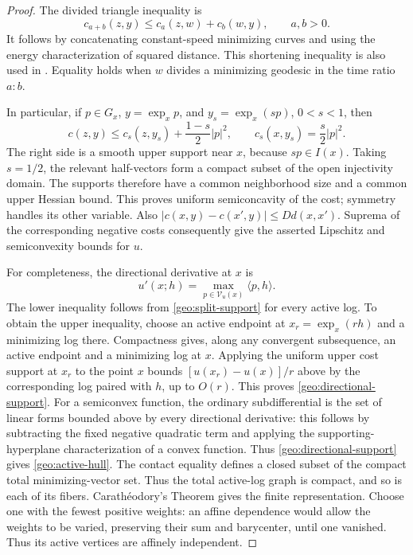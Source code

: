 \begin{proof}
The divided triangle inequality is
\begin{equation}
 \label{geo:divided-triangle}
 c_{a+b}(z,y)\leq c_a(z,w)+c_b(w,y),\qquad a,b>0.
\end{equation}
It follows by concatenating constant-speed minimizing curves and using
the energy characterization of squared distance. This shortening
inequality is also used in \cite[Claim~2.4]{CMS2001}.
Equality holds when
$w$ divides a minimizing geodesic in the time ratio $a:b$.

In particular, if $p\in G_x$, $y=\exp_xp$, and $y_s=\exp_x(sp)$,
$0<s<1$, then
\begin{equation}
 \label{geo:split-support}
 c(z,y)\leq c_s(z,y_s)+\frac{1-s}{2}|p|^2,
 \qquad c_s(x,y_s)=\frac{s}{2}|p|^2.
\end{equation}
The right side is a smooth upper support near $x$, because $sp\in I(x)$.
Taking $s=1/2$, the relevant half-vectors form a compact subset of the
open injectivity domain.  The supports therefore have a common
neighborhood size and a common upper Hessian bound.  This proves
uniform semiconcavity of the cost; symmetry handles its other variable.
Also
$|c(x,y)-c(x',y)|\leq Dd(x,x')$.  Suprema of the corresponding
negative costs consequently give the asserted Lipschitz and
semiconvexity bounds for $u$.

For completeness, the directional derivative at $x$ is
\begin{equation}
 \label{geo:directional-support}
 u'(x;h)=\max_{p\in\mathcal V_u(x)}\langle p,h\rangle.
\end{equation}
The lower inequality follows from \eqref{geo:split-support} for every
active log.  To obtain the upper inequality, choose an active endpoint
at $x_r=\exp_x(rh)$ and a minimizing log there.  Compactness gives,
along any convergent subsequence, an active endpoint and a minimizing
log at $x$.  Applying the uniform upper cost support at $x_r$ to the
point $x$ bounds
$[u(x_r)-u(x)]/r$ above by the corresponding log paired with $h$,
up to $O(r)$.  This proves \eqref{geo:directional-support}.
For a semiconvex function, the ordinary subdifferential is the set of
linear forms bounded above by every directional derivative: this
follows by subtracting the fixed negative quadratic term and applying
the supporting-hyperplane characterization of a convex function.
Thus \eqref{geo:directional-support} gives \eqref{geo:active-hull}.
The contact equality defines a closed subset of the compact total
minimizing-vector set. Thus the total active-log graph is compact,
and so is each of its fibers.  Carath\'eodory's Theorem gives the finite
representation.  Choose one with the fewest positive weights: an
affine dependence would allow the weights to be varied, preserving
their sum and barycenter, until one vanished.  Thus its active
vertices are affinely independent.
\end{proof}

